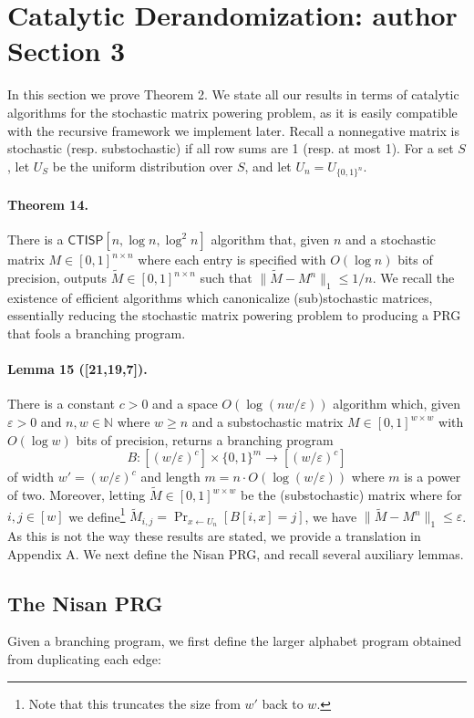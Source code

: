 \documentclass[10pt,a4paper]{article}
\begin{document}
\section*{Catalytic Derandomization: author Section 3}
In this section we prove Theorem 2. We state all our results in terms of catalytic algorithms for the stochastic matrix powering problem, as it is easily compatible with the recursive framework we implement later. Recall a nonnegative matrix is stochastic (resp. substochastic) if all row sums are 1 (resp. at most 1). For a set $S$, let $U_S$ be the uniform distribution over $S$, and let $U_n=U_{\{0,1\}^n}$.
\paragraph{Theorem 14.} There is a $\mathsf{CTISP}[n,\log n,\log^2 n]$ algorithm that, given $n$ and a stochastic matrix $M\in[0,1]^{n\times n}$ where each entry is specified with $O(\log n)$ bits of precision, outputs $\widetilde M\in[0,1]^{n\times n}$ such that $\|\widetilde M-M^n\|_1\leq1/n$.
We recall the existence of efficient algorithms which canonicalize (sub)stochastic matrices, essentially reducing the stochastic matrix powering problem to producing a PRG that fools a branching program.
\paragraph{Lemma 15 ([21,19,7]).} There is a constant $c>0$ and a space $O(\log(nw/\varepsilon))$ algorithm which, given $\varepsilon>0$ and $n,w\in\mathbb N$ where $w\geq n$ and a substochastic matrix $M\in[0,1]^{w\times w}$ with $O(\log w)$ bits of precision, returns a branching program
\[B:[(w/\varepsilon)^c]\times\{0,1\}^m\to[(w/\varepsilon)^c]\]
of width $w'=(w/\varepsilon)^c$ and length $m=n\cdot O(\log(w/\varepsilon))$ where $m$ is a power of two. Moreover, letting $\widetilde M\in[0,1]^{w\times w}$ be the (substochastic) matrix where for $i,j\in[w]$ we define\footnote{Note that this truncates the size from $w'$ back to $w$.} $\widetilde M_{i,j}=\Pr_{x\leftarrow U_n}[B[i,x]=j]$, we have $\|\widetilde M-M^n\|_1\leq\varepsilon$.
As this is not the way these results are stated, we provide a translation in Appendix A. We next define the Nisan PRG, and recall several auxiliary lemmas.
\subsection*{The Nisan PRG}
Given a branching program, we first define the larger alphabet program obtained from duplicating each edge:
\end{document}
